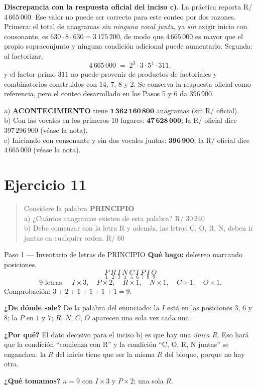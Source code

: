\documentclass[11pt]{article}
\begin{document}
\begin{nota}
\textbf{Discrepancia con la respuesta oficial del inciso c).} La práctica reporta R/ $4\,665\,000$. Ese
valor no puede ser correcto para este conteo por dos razones. Primera: el total de anagramas \emph{sin
ninguna vocal junta}, ya \emph{sin} exigir inicio con consonante, es
$630\cdot 8\cdot 630 = 3\,175\,200$, de modo que $4\,665\,000$ es mayor que el propio supraconjunto y
ninguna condición adicional puede aumentarlo. Segunda: al factorizar,
\[
4\,665\,000 \;=\; 2^{3}\cdot 3\cdot 5^{4}\cdot 311 ,
\]
y el factor primo $311$ no puede provenir de productos de factoriales y combinatorios construidos con
$14$, $7$, $8$ y $2$. Se conserva la respuesta oficial como referencia, pero el conteo desarrollado en los
Pasos 5 y 6 da $396\,900$.
\end{nota}

\begin{resp}
a) \textbf{ACONTECIMIENTO} tiene $\mathbf{1\,362\,160\,800}$ anagramas (sin R/ oficial).\\
b) Con las vocales en los primeros $10$ lugares: $\mathbf{47\,628\,000}$; la R/ oficial dice
$397\,296\,900$ (véase la nota).\\
c) Iniciando con consonante y sin dos vocales juntas: $\mathbf{396\,900}$; la R/ oficial dice
$4\,665\,000$ (véase la nota).
\end{resp}

\section*{Ejercicio 11}

\begin{quote}
Considere la palabra \textbf{PRINCIPIO}\\
a) ¿Cuántos anagramas existen de esta palabra? \hfill R/ 30\,240\\
b) Debe comenzar con la letra R y además, las letras C, O, R, N, deben ir juntas en cualquier orden.
\hfill R/ 60
\end{quote}

\begin{paso}{Paso 1 --- Inventario de letras de PRINCIPIO}
\textbf{Qué hago:} deletreo marcando posiciones.
\[
\underset{1}{P}\ \underset{2}{R}\ \underset{3}{I}\ \underset{4}{N}\ \underset{5}{C}\ \underset{6}{I}\
\underset{7}{P}\ \underset{8}{I}\ \underset{9}{O}
\]
\[
9 \text{ letras}:\quad I\times 3,\quad P\times 2,\quad R\times 1,\quad N\times 1,\quad C\times 1,\quad
O\times 1 .
\]
Comprobación: $3+2+1+1+1+1=9$. \checkmark

\textbf{¿De dónde sale?} De la palabra del enunciado: la $I$ está en las posiciones $3$, $6$ y $8$; la $P$ en
$1$ y $7$; $R$, $N$, $C$, $O$ aparecen una sola vez cada una.

\textbf{¿Por qué?} El dato decisivo para el inciso b) es que hay una \emph{única} $R$. Eso hará que la
condición ``comienza con R'' y la condición ``C, O, R, N juntas'' se enganchen: la $R$ del inicio tiene que
ser la misma $R$ del bloque, porque no hay otra.

\textbf{¿Qué tomamos?} $n=9$ con $I\times3$ y $P\times2$; una sola $R$.
\end{paso}
\end{document}
